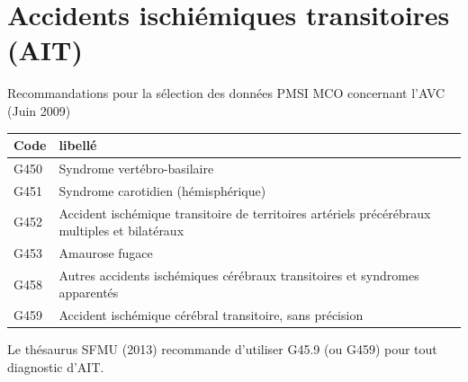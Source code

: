 \documentclass[12pt,english,french,twoside]{report}\usepackage[]{graphicx}\usepackage[]{color}
\begin{document}
\section{Accidents ischiémiques transitoires (AIT)}

Recommandations pour la sélection des données PMSI MCO concernant l’AVC (Juin 2009)

\begin{longtable}{|l|l|}
 \hline
 Code & libellé\\
 \hline
G450 & Syndrome vertébro-basilaire \\
G451 & Syndrome carotidien (hémisphérique) \\
G452 & Accident ischémique transitoire de territoires artériels précérébraux multiples et bilatéraux \\
G453  & Amaurose fugace \\
G458  & Autres accidents ischémiques cérébraux transitoires et syndromes apparentés \\
G459  & Accident ischémique cérébral transitoire, sans précision \\  
  \hline
\end{longtable}

Le thésaurus SFMU (2013) \cite{9} recommande d'utiliser G45.9 (ou G459) pour tout diagnostic d'AIT.
\end{document}
